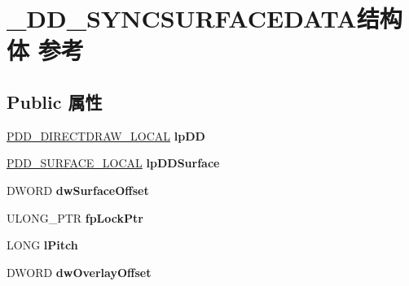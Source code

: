 \hypertarget{struct___d_d___s_y_n_c_s_u_r_f_a_c_e_d_a_t_a}{}\section{\+\_\+\+D\+D\+\_\+\+S\+Y\+N\+C\+S\+U\+R\+F\+A\+C\+E\+D\+A\+T\+A结构体 参考}
\label{struct___d_d___s_y_n_c_s_u_r_f_a_c_e_d_a_t_a}
\subsection*{Public 属性}
\begin{DoxyCompactItemize}
\item 
\mbox{\label{struct___d_d___s_y_n_c_s_u_r_f_a_c_e_d_a_t_a_a803d0fb83ada4d0ce3a937a353bd02d6}} 
\hyperlink{struct___d_d___d_i_r_e_c_t_d_r_a_w___l_o_c_a_l}{P\+D\+D\+\_\+\+D\+I\+R\+E\+C\+T\+D\+R\+A\+W\+\_\+\+L\+O\+C\+AL} {\bfseries lp\+DD}
\item 
\mbox{\label{struct___d_d___s_y_n_c_s_u_r_f_a_c_e_d_a_t_a_ae794ede8f1eb50a2de9b99dd546ca40d}} 
\hyperlink{struct___d_d___s_u_r_f_a_c_e___l_o_c_a_l}{P\+D\+D\+\_\+\+S\+U\+R\+F\+A\+C\+E\+\_\+\+L\+O\+C\+AL} {\bfseries lp\+D\+D\+Surface}
\item 
\mbox{\label{struct___d_d___s_y_n_c_s_u_r_f_a_c_e_d_a_t_a_ac5385d65e720eecb28f75339a6688309}} 
D\+W\+O\+RD {\bfseries dw\+Surface\+Offset}
\item 
\mbox{\label{struct___d_d___s_y_n_c_s_u_r_f_a_c_e_d_a_t_a_aae02a2de1766e9c2b7b27e20ac95bb86}} 
U\+L\+O\+N\+G\+\_\+\+P\+TR {\bfseries fp\+Lock\+Ptr}
\item 
\mbox{\label{struct___d_d___s_y_n_c_s_u_r_f_a_c_e_d_a_t_a_a0fcb3b19e9560af74ec2826d00651200}} 
L\+O\+NG {\bfseries l\+Pitch}
\item 
\mbox{\label{struct___d_d___s_y_n_c_s_u_r_f_a_c_e_d_a_t_a_a34e8dd56ce46236320665b166977d4c8}} 
D\+W\+O\+RD {\bfseries dw\+Overlay\+Offset}
\item 

\end{DoxyCompactItemize}
